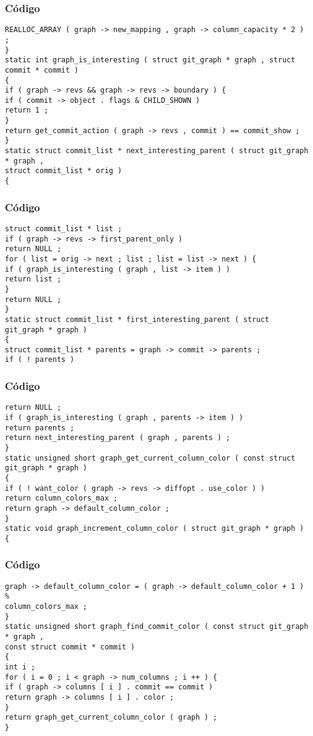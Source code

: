 \documentclass{beamer}
\begin{document}
\begin{frame}[fragile]
\frametitle{C\'odigo}
\begin{verbatim}
REALLOC_ARRAY ( graph -> new_mapping , graph -> column_capacity * 2 ) ; 
} 
static int graph_is_interesting ( struct git_graph * graph , struct commit * commit ) 
{ 
if ( graph -> revs && graph -> revs -> boundary ) { 
if ( commit -> object . flags & CHILD_SHOWN ) 
return 1 ; 
} 
return get_commit_action ( graph -> revs , commit ) == commit_show ; 
} 
static struct commit_list * next_interesting_parent ( struct git_graph * graph , 
struct commit_list * orig ) 
{ 
\end{verbatim}
\end{frame}
\begin{frame}[fragile]
\frametitle{C\'odigo}
\begin{verbatim}
struct commit_list * list ; 
if ( graph -> revs -> first_parent_only ) 
return NULL ; 
for ( list = orig -> next ; list ; list = list -> next ) { 
if ( graph_is_interesting ( graph , list -> item ) ) 
return list ; 
} 
return NULL ; 
} 
static struct commit_list * first_interesting_parent ( struct git_graph * graph ) 
{ 
struct commit_list * parents = graph -> commit -> parents ; 
if ( ! parents ) 
\end{verbatim}
\end{frame}
\begin{frame}[fragile]
\frametitle{C\'odigo}
\begin{verbatim}
return NULL ; 
if ( graph_is_interesting ( graph , parents -> item ) ) 
return parents ; 
return next_interesting_parent ( graph , parents ) ; 
} 
static unsigned short graph_get_current_column_color ( const struct git_graph * graph ) 
{ 
if ( ! want_color ( graph -> revs -> diffopt . use_color ) ) 
return column_colors_max ; 
return graph -> default_column_color ; 
} 
static void graph_increment_column_color ( struct git_graph * graph ) 
{ 
\end{verbatim}
\end{frame}
\begin{frame}[fragile]
\frametitle{C\'odigo}
\begin{verbatim}
graph -> default_column_color = ( graph -> default_column_color + 1 ) % 
column_colors_max ; 
} 
static unsigned short graph_find_commit_color ( const struct git_graph * graph , 
const struct commit * commit ) 
{ 
int i ; 
for ( i = 0 ; i < graph -> num_columns ; i ++ ) { 
if ( graph -> columns [ i ] . commit == commit ) 
return graph -> columns [ i ] . color ; 
} 
return graph_get_current_column_color ( graph ) ; 
} 
\end{verbatim}
\end{frame}
\end{document}

